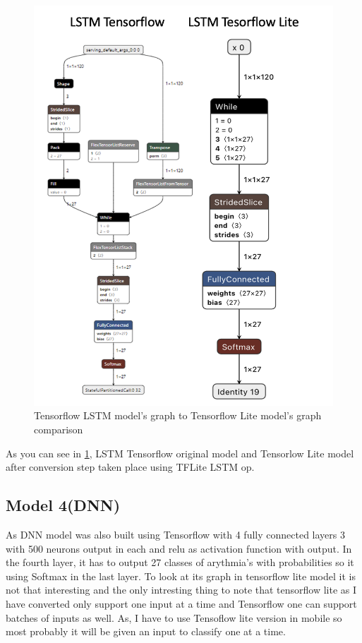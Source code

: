 \begin{figure}[H]
\centering
\includegraphics[scale=0.7]{img/lstm_conversion_comparison.png}
\caption{Tensorflow LSTM model's graph to Tensorflow Lite model's graph comparison}
\label{fig:lstm_conversion_comparison}
\end{figure}


As you can see in \ref{fig:lstm_conversion_comparison}, LSTM Tensorflow original model and Tensorlow Lite model after conversion step taken place using TFLite LSTM op. 

\subsection{Model 4(DNN)}\label{5CTLM4}

As DNN model was also built using Tensorflow with 4 fully connected layers 3 with 500 neurons output in each and relu as activation function with output. In the fourth layer, it has to output 27 classes of arythmia's with probabilities so it using Softmax in the last layer. To look at its graph in tensorflow lite model it is not that interesting and the only intresting thing to note that tensorflow lite as I have converted only support one input at a time and Tensorflow one can support batches of inputs as well. As, I have to use Tensoflow lite version in mobile so most probably it will be given an input to classify one at a time. 


